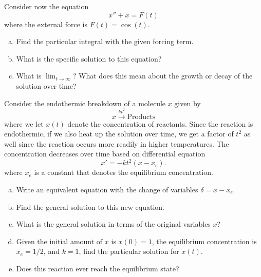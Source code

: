 \begin{problem}
Consider now the equation
\[
x''+x=F(t)
\]
where the external force is $F(t)=\cos(t)$.
\begin{enumerate}[(a)]
    \item Find the particular integral with the given forcing term.
    \item What is the specific solution to this equation?
    \item What is $\lim_{t\to \infty}$? What does this mean about the growth or decay of the solution over time?
\end{enumerate}
\end{problem}

\begin{problem}
Consider the endothermic breakdown of a molecule $x$ given by
\[
x \xrightarrow{kt^2} \textrm{Products}
\]
where we let $x(t)$ denote the concentration of reactants. Since the reaction is endothermic, if we also heat up the solution over time, we get a factor of $t^2$ as well since the reaction occurs more readily in higher temperatures. The concentration decreases over time based on differential equation
\[
x'=-kt^2(x-x_e).
\]
where $x_e$ is a constant that denotes the equilibrium concentration.
\begin{enumerate}[(a)]
    \item Write an equivalent equation with the change of variables $\delta=x-x_e$.
    \item Find the general solution to this new equation.
    \item What is the general solution in terms of the original variables $x$?
    \item Given the initial amount of $x$ is $x(0)=1$, the equilibrium concentration is $x_e=1/2$, and $k=1$, find the particular solution for $x(t)$.
    \item Does this reaction ever reach the equilibrium state?
\end{enumerate}
\end{problem}

